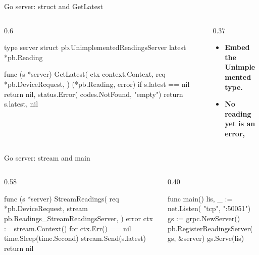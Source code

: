 \documentclass[10pt,aspectratio=169,t]{beamer}
\begin{document}
\begin{frame}[fragile,eyebrow=Task I]{Go server: struct and GetLatest}
  \begin{columns}[T]
    \begin{column}{0.6\textwidth}
\begin{golang}
type server struct {
    pb.UnimplementedReadingsServer
    latest *pb.Reading
}

func (s *server) GetLatest(
    ctx context.Context, req *pb.DeviceRequest,
) (*pb.Reading, error) {
    if s.latest == nil {
        return nil, status.Error(
            codes.NotFound, "empty")
    }
    return s.latest, nil
}
\end{golang}
    \end{column}
    \begin{column}{0.37\textwidth}
      \begin{itemize}
        \item \textbf{Embed the Unimplemented type.} 
        \item \textbf{No reading yet is an error,} 
      \end{itemize}
    \end{column}
  \end{columns}
\end{frame}

\begin{frame}[fragile,eyebrow=Task I]{Go server: stream and main}
  \begin{columns}[T]
    \begin{column}{0.58\textwidth}
\begin{golang}
func (s *server) StreamReadings(
    req *pb.DeviceRequest,
    stream pb.Readings_StreamReadingsServer,
) error {
    ctx := stream.Context()
    for ctx.Err() == nil {
        time.Sleep(time.Second)
        stream.Send(s.latest)
    }
    return nil
}
\end{golang}
    \end{column}
    \begin{column}{0.40\textwidth}
\begin{golang}
func main() {
    lis, _ := net.Listen(
        "tcp", ":50051")
    gs := grpc.NewServer()
    pb.RegisterReadingsServer(
        gs, &server{})
    gs.Serve(lis)
}
\end{golang}
    \end{column}
  \end{columns}
\end{frame}
\end{document}
